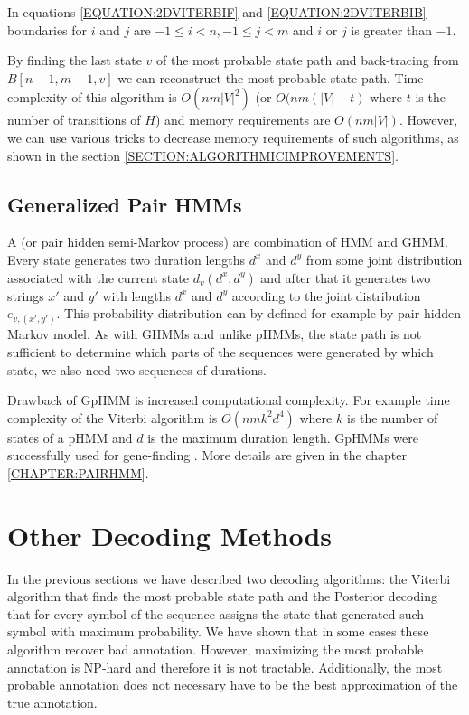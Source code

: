 In equations \ref{EQUATION:2DVITERBIF} and \ref{EQUATION:2DVITERBIB} boundaries for $i$ and $j$ are $
-1\leq i< n,-1\leq j< m$ and $i$ or $j$ is greater than $-1$.


By finding the last state $v$ of the most probable state path and back-tracing
from $B[n-1,m-1,v]$ we can reconstruct the most probable state path. Time
complexity of this algorithm is $O(nm|V|^2)$ (or $O(nm(|V|+t)$ where $t$ is the
number of transitions of $H$) and memory requirements are $O(nm|V|)$. However,
we can use various tricks to decrease memory requirements of such algorithms, as
shown in the section \ref{SECTION:ALGORITHMICIMPROVEMENTS}.

\subsection{Generalized Pair HMMs}


A  (or pair hidden semi-Markov
process) are combination of HMM and GHMM. Every state generates two
duration lengths $d^x$ and $d^y$ from some joint distribution associated with
the current state $d_v(d^x,d^y)$ and after that it generates two strings $x'$
and $y'$ with lengths $d^x$ and $d^y$ according to the joint distribution
$e_{v,(x',y')}$. This probability distribution can by defined for example by
pair hidden Markov model.  As with GHMMs and unlike pHMMs, the state path is not
sufficient to determine which parts of the sequences were generated by which
state, we also need two sequences of durations.

Drawback of GpHMM is increased computational complexity. For example time
complexity of the Viterbi algorithm is $O(nmk^2d^4)$\cite{Meyer2002} where $k$
is the number of states of a pHMM and $d$ is the maximum duration length.
GpHMMs were successfully used for gene-finding
\cite{SLAM2003,Alexanderson2004,Majoros2005,Meyer2002}. More details are given in
the chapter \ref{CHAPTER:PAIRHMM}.



\section{Other Decoding Methods}
In the previous sections we have described two decoding algorithms: the Viterbi algorithm
that finds the most probable state path  and the Posterior decoding that for
every symbol of the sequence assigns the state that generated such symbol with
maximum probability. 
We have shown that in some cases these algorithm recover bad
annotation. However, maximizing the most probable annotation is NP-hard and
therefore it is not tractable. Additionally, the most probable annotation does
not necessary have to be the best approximation of the true annotation.

